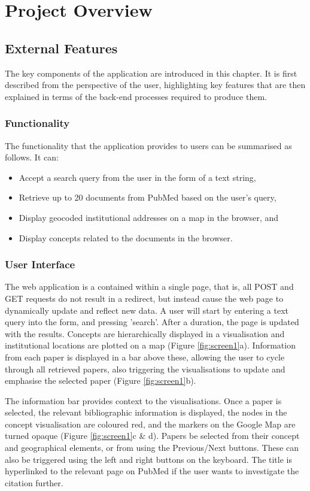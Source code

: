 \documentclass[Report.tex]{subfiles}
\begin{document}
\chapter{Project Overview}
\section{External Features}
The key components of the application are introduced in this chapter. It is first described from the perspective of the user, highlighting key features that are then explained in terms of the back-end processes required to produce them.

\subsection{Functionality}
The functionality that the application provides to users can be summarised as follows. It can:
\begin{itemize}
\item Accept a search query from the user in the form of a text string,
\item Retrieve up to 20 documents from PubMed based on the user's query,
\item Display geocoded institutional addresses on a map in the browser, and
\item Display concepts related to the documents in the browser.
\end{itemize}

\subsection{User Interface}
The web application is a contained within a single page, that is, all POST and GET requests do not result in a redirect, but instead cause the web page to dynamically update and reflect new data. A user will start by entering a text query into the form, and pressing 'search'. After a duration, the page is updated with the results. Concepts are hierarchically displayed in a visualisation and institutional locations are plotted on a map (Figure \ref{fig:screen1}a). Information from each paper is displayed in a bar above these, allowing the user to cycle through all retrieved papers, also triggering the visualisations to update and emphasise the selected paper (Figure \ref{fig:screen1}b).\newline

\noindent The information bar provides context to the visualisations. Once a paper is selected, the relevant bibliographic information is displayed, the nodes in the concept visualisation are coloured red, and the markers on the Google Map are turned opaque (Figure \ref{fig:screen1}c \& d). Papers be selected from their concept and geographical elements, or from using the Previous/Next buttons. These can also be triggered using the left and right buttons on the keyboard. The title is hyperlinked to the relevant page on PubMed if the user wants to investigate the citation further. \newline
\end{document}
